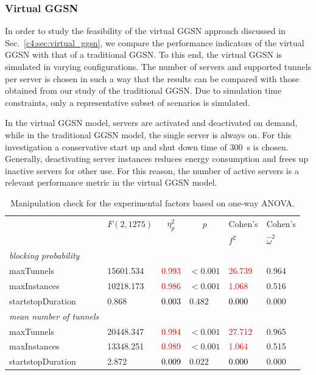 \subsubsection{Virtual GGSN}
\label{c4:sec:eval_ideal_virtual_ggsn}

In order to study the feasibility of the virtual \gls{GGSN} approach discussed in Sec.~\ref{c4:sec:virtual_ggsn}, we compare the performance indicators of the virtual \gls{GGSN} with that of a traditional \gls{GGSN}. To this end, the virtual \gls{GGSN} is simulated in varying configurations.
The number of servers and supported tunnels per server is chosen in such a way that the results can be compared with those obtained from our study of the traditional \gls{GGSN}. Due to simulation time constraints, only a representative subset of scenarios is simulated.

In the virtual \gls{GGSN} model, servers are activated and deactivated on demand, while in the traditional \gls{GGSN} model, the single server is always on. For this investigation a conservative start up and shut down time of \SI{300}{\second} is chosen. Generally, deactivating server instances reduces energy consumption and frees up inactive servers for other use. For this reason, the number of active servers is a relevant performance metric in the virtual \gls{GGSN} model.


\begin{table}[htp]
	\caption{Manipulation check for the experimental factors based on one-way ANOVA.}
	\centering
	\label{c4:tab:manipulation2color}
	\begin{tabu}{X[l]X[r]X[r]X[r]XX}%
	\toprule
	&  &  &  & Cohen's & Cohen's\\ 
	&  & & & $f^2$ & $\hat{\omega}^2$ \\ 
	\midrule
	\emph{blocking probability}  & & & & &\\ 
	maxTunnels &  15601.534 & \textcolor{red}{0.993} & $<0.001$ & \textcolor{red}{26.739} & 0.964\\ 
	maxInstances &  10218.173 & \textcolor{red}{0.986} & $<0.001$ & \textcolor{red}{1.068} & 0.516\\ 
	startstopDuration &  0.868 & \textcolor{black}{0.003} & $0.482$ & \textcolor{black}{0.000} & 0.000\\ 
	\midrule
	\emph{mean number of tunnels}  & & & & &\\ 
	maxTunnels &  20448.347 & \textcolor{red}{0.994} & $<0.001$ & \textcolor{red}{27.712} & 0.965\\ 
	maxInstances &  13348.251 & \textcolor{red}{0.989} & $<0.001$ & \textcolor{red}{1.064} & 0.515\\ 
	startstopDuration &  2.872 & \textcolor{black}{0.009} & $0.022$ & \textcolor{black}{0.000} & 0.000\\ 
	\bottomrule
	\end{tabu}
\end{table}

